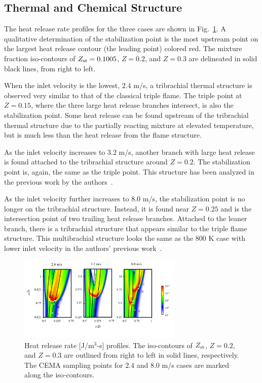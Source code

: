 \documentclass{wssci}
\begin{document}
\subsection{Thermal and Chemical Structure}  
The heat release rate profiles for the three cases are shown in Fig.~\ref{fig:HRR_V}.  A qualitative determination of the stabilization point is the most upstream point on the largest heat release contour (the leading point) colored red.  The mixture fraction iso-contours of $Z_{\rm st} = 0.1005$, $Z = 0.2$, and $Z = 0.3$ are delineated in solid black lines, from right to left.

When the inlet velocity is the lowest, $2.4$ m/s, a tribrachial thermal structure is observed very similar to that of the classical triple flame.  The triple point at $Z = 0.15$, where the three large heat release branches intersect, is also the stabilization point.  Some heat release can be found upstream of the tribrachial thermal structure due to the partially reacting mixture at elevated temperature, but is much less than the heat release from the flame structure. 

As the inlet velocity increases to $3.2$ m/s, another branch with large heat release is found attached to the tribrachial structure around $Z = 0.2$.  The stabilization point is, again, the same as the triple point.  This structure has been analyzed in the previous work by the authors~\cite{deng15}.

As the inlet velocity further increases to $8.0$ m/s, the stabilization point is no longer on the tribrachial structure.  Instead, it is found near $Z = 0.25$ and is the intersection point of two trailing heat release branches.  Attached to the leaner branch, there is a tribrachial structure that appears similar to the triple flame structure.  This multibrachial structure looks the same as the $800$ K case with lower inlet velocity in the authors' previous work~\cite{deng15}.

\begin{figure}
  \centering
  \scriptsize
  \vspace{-0.1in}
  \includegraphics[width=0.7\textwidth]{HRR_V.png}
  \normalsize
  \vspace{-0.4in}
  \caption{Heat release rate [J/m$^3$-s] profiles.  The iso-contours of $Z_{\rm st}$, $Z = 0.2$, and $Z = 0.3$ are outlined from right to left in solid lines, respectively.  The CEMA sampling points for $2.4$ and $8.0$ m/s cases are marked along the iso-contours.}
  \label{fig:HRR_V}
\end{figure}
\end{document}
